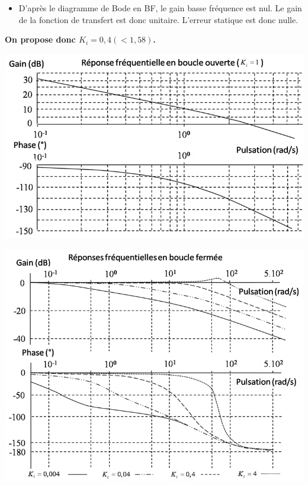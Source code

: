 \documentclass[10pt,fleqn]{article} %
\begin{document}
\begin{multicols}{2}
\begin{corrige}
\begin{itemize}
\item D'après le diagramme de Bode en BF, le gain basse fréquence est nul. Le gain de la fonction de transfert est donc unitaire. L'erreur statique est donc nulle. 
\end{itemize}

\textbf{On propose donc $K_i=0,4 (<1,58)$.}
\end{corrige}
\else
\fi



\ifprof
\else

\begin{center}
\includegraphics[width=\linewidth]{images/bo}
\end{center}

\begin{center}
\includegraphics[width=\linewidth]{images/bf}
\end{center}


\end{multicols}
\end{document}

